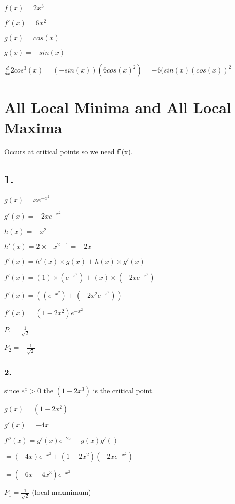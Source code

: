 \documentclass[12pt,a4paper]{article}
\begin{document}
\noindent $f(x) = 2x^3$

\noindent $f'(x) = 6x^2$

\noindent $g(x) = cos(x)$

\noindent $g(x) = -sin(x)$
\newline

\noindent $\frac{d}{dx} 2cos^3 (x) = (-sin(x))(6cos(x)^2) = -6(sin(x)(cos(x))^2$

\newpage

\section*{All Local Minima and All Local Maxima}
Occurs at critical points so we need f'(x).

\subsection*{1.}
\noindent $g(x) = xe^{-x^2}$

\noindent $g'(x) = -2xe^{-x^2}$

\noindent $h(x) = -x^2$

\noindent $h'(x) = 2 \times -x^{2-1} = -2x$
\newline

\noindent $f'(x) = h'(x) \times g(x) + h(x) \times g'(x)$

\noindent $f'(x) = (1) \times (e^{-x^2}) + (x) \times (-2xe^{-x^2})$

\noindent $f'(x) = ((e^{-x^2}) + (-2x^2 e^{-x^2}))$

\noindent $\boxed{f'(x) = (1 - 2x^2)e^{-x^2}}$

$P_1 = \frac{1}{\sqrt{2}}$

$P_2 = -\frac{1}{\sqrt{2}}$

\subsubsection*{2.}

since $e^x > 0$  the $(1 - 2x^3)$ is the critical point.


\noindent $g(x) = (1 - 2x^2)$

\noindent $g'(x) = -4x$

\noindent $f''(x) = g'(x)e^{-2x} + g(x)g'()$

$= (-4x)e^{-x^2} + (1 - 2x^2)(-2xe^{-x^2})$

$= (-6x+4x^3)e^{-x^2}$



$P_1 = \frac{1}{\sqrt{2}}$ (local maxmimum)
\end{document}
